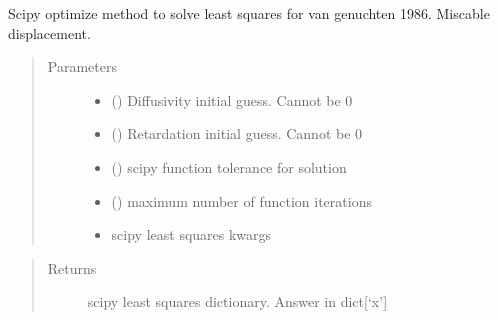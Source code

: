 \documentclass[letterpaper,10pt,english]{sphinxmanual}
\begin{document}
\begin{fulllineitems}
\begin{fulllineitems}
\end{fulllineitems}


\begin{fulllineitems}
\label{\detokenize{index:lb_colloids.Colloids.Colloid_output.ADE.solve_van_genuchten_1986}}
Scipy optimize method to solve least squares
for van genuchten 1986. Miscable displacement.
\begin{quote}\begin{description}
\item[{Parameters}] \leavevmode\begin{itemize}
\item {} 
 () \textendash{} Diffusivity initial guess. Cannot be 0

\item {} 
 () \textendash{} Retardation initial guess. Cannot be 0

\item {} 
 () \textendash{} scipy function tolerance for solution

\item {} 
 () \textendash{} maximum number of function iterations

\item {} 
 \textendash{} 
scipy least squares kwargs


\end{itemize}

\end{description}\end{quote}
\begin{quote}\begin{description}
\item[{Returns}] \leavevmode
scipy least squares dictionary. Answer in dict{[}‘x’{]}

\end{description}\end{quote}

\end{fulllineitems}


\end{fulllineitems}
\end{document}
